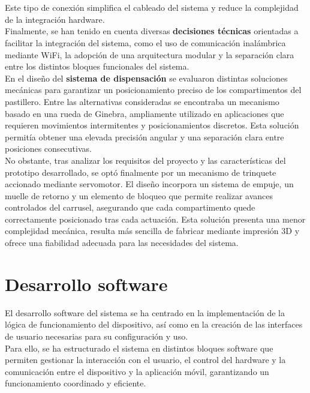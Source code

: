\

\

Este tipo de conexión simplifica el cableado del sistema y reduce la complejidad de la integración hardware.\\

Finalmente, se han tenido en cuenta diversas \textbf{decisiones técnicas} orientadas a facilitar la integración del sistema, como el uso de comunicación inalámbrica mediante WiFi, la adopción de una arquitectura modular y la separación clara entre los distintos bloques funcionales del sistema.\\


En el diseño del \textbf{sistema de dispensación} se evaluaron distintas soluciones mecánicas para garantizar un posicionamiento preciso de los compartimentos del pastillero. Entre las alternativas consideradas se encontraba un mecanismo basado en una rueda de Ginebra, ampliamente utilizado en aplicaciones que requieren movimientos intermitentes y posicionamientos discretos. Esta solución permitía obtener una elevada precisión angular y una separación clara entre posiciones consecutivas.\\

No obstante, tras analizar los requisitos del proyecto y las características del prototipo desarrollado, se optó finalmente por un mecanismo de trinquete accionado mediante servomotor. El diseño incorpora un sistema de empuje, un muelle de retorno y un elemento de bloqueo que permite realizar avances controlados del carrusel, asegurando que cada compartimento quede correctamente posicionado tras cada actuación. Esta solución presenta una menor complejidad mecánica, resulta más sencilla de fabricar mediante impresión 3D y ofrece una fiabilidad adecuada para las necesidades del sistema.


\section{Desarrollo software}
\label{sec:desarrollo_software}

El desarrollo software del sistema se ha centrado en la implementación de la lógica de funcionamiento del dispositivo, así como en la creación de las interfaces de usuario necesarias para su configuración y uso.\\

Para ello, se ha estructurado el sistema en distintos bloques software que permiten gestionar la interacción con el usuario, el control del hardware y la comunicación entre el dispositivo y la aplicación móvil, garantizando un funcionamiento coordinado y eficiente.

